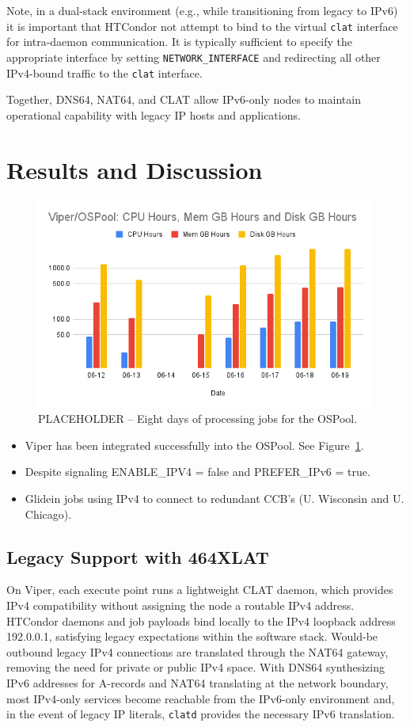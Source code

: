 \documentclass[11pt]{article}
\begin{document}
Note, in a dual-stack environment (e.g., while transitioning from legacy to IPv6) it is important that HTCondor not attempt to bind to the virtual \texttt{clat} interface for intra-daemon communication. It is typically sufficient to specify the appropriate interface by setting \texttt{NETWORK\_INTERFACE} and redirecting all other IPv4-bound traffic to the \texttt{clat} interface.  


Together, DNS64, NAT64, and CLAT allow IPv6-only nodes to maintain operational capability with legacy IP hosts and applications. 

\section{Results and Discussion}

\begin{figure}[htbp]
  \centering
  \includegraphics[width=0.49\linewidth]{Viper_OSPool_utilization.png}
  \caption{PLACEHOLDER -- Eight days of processing jobs for the OSPool.}
  \label{fig:viper-jobs}
\end{figure}


\begin{itemize}
\item Viper has been integrated successfully into the OSPool. See Figure~\ref{fig:viper-jobs}. 
\item Despite signaling ENABLE\_IPV4 = false and PREFER\_IPv6 = true.
\item Glidein jobs using IPv4 to connect to redundant CCB's (U. Wisconsin and U. Chicago).
\end{itemize}

\subsection{Legacy Support with 464XLAT}

On Viper, each execute point runs a lightweight CLAT daemon, which provides IPv4 compatibility without assigning the node a routable IPv4 address. HTCondor daemons and job payloads bind locally to the IPv4 loopback address 192.0.0.1, satisfying legacy expectations within the software stack. Would-be outbound legacy IPv4 connections are translated through the NAT64 gateway, removing the need for private or public IPv4 space. With DNS64 synthesizing IPv6 addresses for A-records and NAT64 translating at the network boundary, most IPv4-only services become reachable from the IPv6-only environment and, in the event of legacy IP literals, \texttt{clatd} provides the necessary IPv6 translation. 
\end{document}
